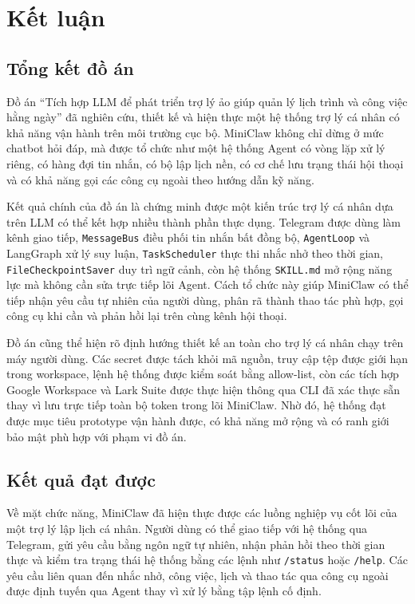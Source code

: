 \chapter{Kết luận}
\label{chap:conclusion}

\section{Tổng kết đồ án}
Đồ án ``Tích hợp LLM để phát triển trợ lý ảo giúp quản lý lịch trình và công việc hằng ngày'' đã nghiên cứu, thiết kế và hiện thực một hệ thống trợ lý cá nhân có khả năng vận hành trên môi trường cục bộ. MiniClaw không chỉ dừng ở mức chatbot hỏi đáp, mà được tổ chức như một hệ thống Agent có vòng lặp xử lý riêng, có hàng đợi tin nhắn, có bộ lập lịch nền, có cơ chế lưu trạng thái hội thoại và có khả năng gọi các công cụ ngoài theo hướng dẫn kỹ năng.

Kết quả chính của đồ án là chứng minh được một kiến trúc trợ lý cá nhân dựa trên LLM có thể kết hợp nhiều thành phần thực dụng. Telegram được dùng làm kênh giao tiếp, \texttt{MessageBus} điều phối tin nhắn bất đồng bộ, \texttt{AgentLoop} và LangGraph xử lý suy luận, \texttt{Task\allowbreak Scheduler} thực thi nhắc nhở theo thời gian, \texttt{File\allowbreak Checkpoint\allowbreak Saver} duy trì ngữ cảnh, còn hệ thống \texttt{SKILL.md} mở rộng năng lực mà không cần sửa trực tiếp lõi Agent. Cách tổ chức này giúp MiniClaw có thể tiếp nhận yêu cầu tự nhiên của người dùng, phân rã thành thao tác phù hợp, gọi công cụ khi cần và phản hồi lại trên cùng kênh hội thoại.

Đồ án cũng thể hiện rõ định hướng thiết kế an toàn cho trợ lý cá nhân chạy trên máy người dùng. Các secret được tách khỏi mã nguồn, truy cập tệp được giới hạn trong workspace, lệnh hệ thống được kiểm soát bằng allow-list, còn các tích hợp Google Workspace và Lark Suite được thực hiện thông qua CLI đã xác thực sẵn thay vì lưu trực tiếp toàn bộ token trong lõi MiniClaw. Nhờ đó, hệ thống đạt được mục tiêu prototype vận hành được, có khả năng mở rộng và có ranh giới bảo mật phù hợp với phạm vi đồ án.

\section{Kết quả đạt được}
Về mặt chức năng, MiniClaw đã hiện thực được các luồng nghiệp vụ cốt lõi của một trợ lý lập lịch cá nhân. Người dùng có thể giao tiếp với hệ thống qua Telegram, gửi yêu cầu bằng ngôn ngữ tự nhiên, nhận phản hồi theo thời gian thực và kiểm tra trạng thái hệ thống bằng các lệnh như \texttt{/status} hoặc \texttt{/help}. Các yêu cầu liên quan đến nhắc nhở, công việc, lịch và thao tác qua công cụ ngoài được định tuyến qua Agent thay vì xử lý bằng tập lệnh cố định.

